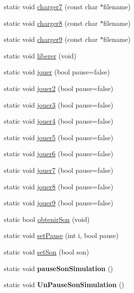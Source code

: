 \begin{DoxyCompactItemize}
\item 
static void \hyperlink{class_son_a6d9fa66ae4f0fceb58d43a07b6488a58}{charger7} (const char $\ast$filename)
\item 
static void \hyperlink{class_son_aadacb3f51c930ff5e925123f7341de41}{charger8} (const char $\ast$filename)
\item 
static void \hyperlink{class_son_a81457c44dfd58ed5f0cf6af5e5853f30}{charger9} (const char $\ast$filename)
\item 
static void \hyperlink{class_son_a320b4c249ebc2975b0ff1701f1b5dedd}{liberer} (void)
\item 
static void \hyperlink{class_son_a8fb1059f22bb1b98ea457e70274b9e16}{jouer} (bool pause=false)
\item 
static void \hyperlink{class_son_a19816ab000eaea791df22596d68f4346}{jouer2} (bool pause=false)
\item 
static void \hyperlink{class_son_a639409c2aee436d476dde86c87f8233d}{jouer3} (bool pause=false)
\item 
static void \hyperlink{class_son_a8afa577fe75e06956cfb619a19eb6878}{jouer4} (bool pause=false)
\item 
static void \hyperlink{class_son_a07069933a43180ff8088ce9a321fc3b4}{jouer5} (bool pause=false)
\item 
static void \hyperlink{class_son_aa773cd3a06954188a4ec3ea2773f3d5c}{jouer6} (bool pause=false)
\item 
static void \hyperlink{class_son_a64024248fe225a077c03c7c02017be95}{jouer7} (bool pause=false)
\item 
static void \hyperlink{class_son_ae6683c701949e8146ceb7f03439fb897}{jouer8} (bool pause=false)
\item 
static void \hyperlink{class_son_a5c25da529d08c7cd49bd10135f874729}{jouer9} (bool pause=false)
\item 
static bool \hyperlink{class_son_aef637c076a523c51849d582adb728c50}{obtenir\+Son} (void)
\item 
static void \hyperlink{class_son_a4cf8d9f5fe6c83206342097d978a52fc}{set\+Pause} (int i, bool pause)
\item 
static void \hyperlink{class_son_a583b171ad1910ed248ccee48c305a96d}{set\+Son} (bool son)
\item 
static void {\bfseries pause\+Son\+Simulation} ()\hypertarget{class_son_a4280a381325de3511b314b4aa8f9fcbb}{}\label{class_son_a4280a381325de3511b314b4aa8f9fcbb}

\item 
static void {\bfseries Un\+Pause\+Son\+Simulation} ()\hypertarget{class_son_ada9a4b46d509d2b7e104bd1a81a78a9d}{}\label{class_son_ada9a4b46d509d2b7e104bd1a81a78a9d}


\end{DoxyCompactItemize}
